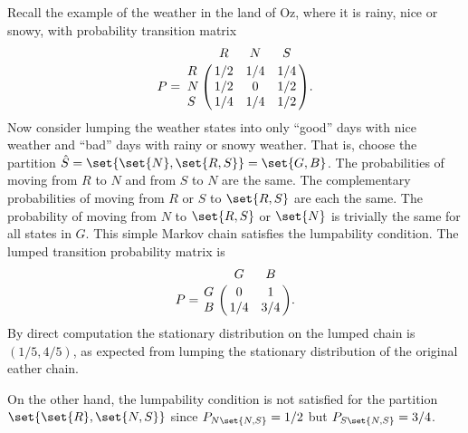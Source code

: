\documentclass[12pt]{article}
\begin{document}
\begin{example}
    Recall the example of the weather in the land of Oz, where it is
    rainy, nice or snowy, with probability transition matrix
    \[
        P = \bordermatrix{ & R & N & S \cr
        R & 1/2 & 1/4 & 1/4 \cr
        N & 1/2 & 0 & 1/2 \cr
        S & 1/4 & 1/4 & 1/2 }.
    \] Now consider lumping the weather states into only ``good'' days
    with nice weather and ``bad'' days with rainy or snowy weather. That
    is, choose the partition \( \hat{S} = \set{ \set{N}, \set{R,S}} =
    \set{G, B} \).  The probabilities of moving from \( R \) to \( N \)
    and from \( S \) to \( N \) are the same.  The complementary
    probabilities of moving from \( R \) or \( S \) to \( \set{R, S} \)
    are each the same.  The probability of moving from \( N \) to \(
    \set{R, S} \) or \( \set{N} \) is trivially the same for all states
    in \( G \).  This simple Markov chain satisfies the
    lumpability condition.  The lumped transition probability matrix is
    \[
        P = \bordermatrix{ & G & B \cr
        G & 0 & 1 \cr
        B & 1/4 & 3/4}.
    \]
    By direct computation the stationary distribution on the lumped chain is \( (1/5, 4/5)
    \), as expected from lumping the stationary distribution of the
    original eather chain.

    On the other hand, the lumpability condition is not satisfied for
    the partition \( \set{ \set{R}, \set{N, S}} \) since \( P_
    {N \set{N, S}} = 1/2 \) but \( P_{S \set{N,S}} = 3/4 \).
\end{example}
\end{document}
